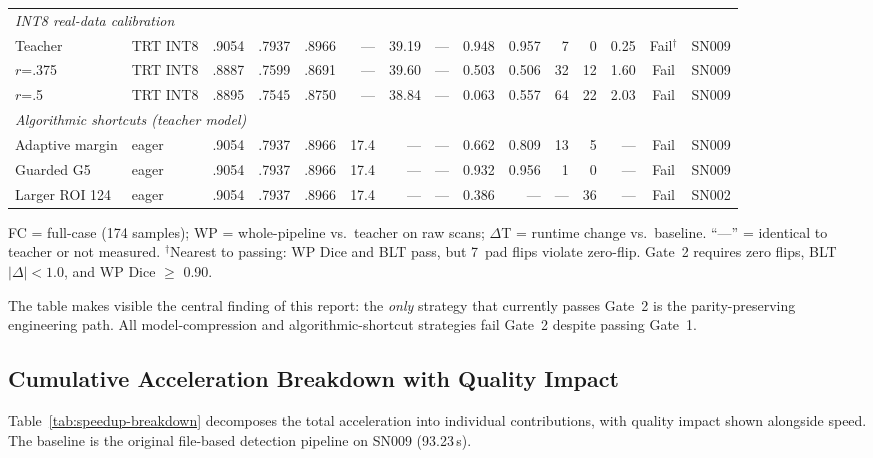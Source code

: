 \begin{table}[H]
\begin{adjustbox}{max width=\textwidth}
\begin{tabular}{ll | rrr | rrr | rr | rr | r | c | l}
\midrule
\multicolumn{15}{l}{\textit{INT8 real-data calibration}} \\
Teacher  & TRT INT8 & .9054 & .7937 & .8966 & --- & 39.19 & --- & 0.948 & 0.957 & 7 & 0 & 0.25 & Fail$^\dagger$ & SN009 \\
$r$=.375 & TRT INT8 & .8887 & .7599 & .8691 & --- & 39.60 & --- & 0.503 & 0.506 & 32 & 12 & 1.60 & Fail & SN009 \\
$r$=.5   & TRT INT8 & .8895 & .7545 & .8750 & --- & 38.84 & --- & 0.063 & 0.557 & 64 & 22 & 2.03 & Fail & SN009 \\
\midrule
\multicolumn{15}{l}{\textit{Algorithmic shortcuts (teacher model)}} \\
Adaptive margin & eager & .9054 & .7937 & .8966 & 17.4 & --- & --- & 0.662 & 0.809 & 13 & 5 & --- & Fail & SN009 \\
Guarded G5      & eager & .9054 & .7937 & .8966 & 17.4 & --- & --- & 0.932 & 0.956 &  1 & 0 & --- & Fail & SN009 \\
Larger ROI 124  & eager & .9054 & .7937 & .8966 & 17.4 & --- & --- & 0.386 & ---   & --- & 36 & --- & Fail & SN002 \\
\bottomrule
\end{tabular}
\end{adjustbox}

\smallskip
{\footnotesize FC = full-case (174 samples); WP = whole-pipeline vs.\ teacher on raw scans; $\Delta$T = runtime change vs.\ baseline. ``---'' = identical to teacher or not measured. $^\dagger$Nearest to passing: WP Dice and BLT pass, but 7~pad flips violate zero-flip. Gate~2 requires zero flips, BLT $|\Delta| < 1.0$, and WP Dice $\geq$ 0.90.}
\end{table}

The table makes visible the central finding of this report: the \emph{only} strategy that currently passes Gate~2 is the parity-preserving engineering path. All model-compression and algorithmic-shortcut strategies fail Gate~2 despite passing Gate~1.

\subsection{Cumulative Acceleration Breakdown with Quality Impact}

Table~\ref{tab:speedup-breakdown} decomposes the total acceleration into individual contributions, with quality impact shown alongside speed. The baseline is the original file-based detection pipeline on SN009 (93.23\,s).

